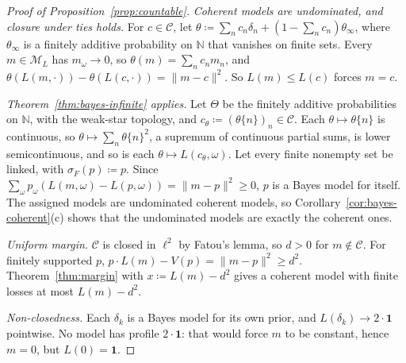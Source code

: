 \documentclass[11pt]{article}
\theoremstyle{definition}
\theoremstyle{remark}
\newcommand{\N}{\mathbb N}
\newcommand{\M}{\mathcal M}
\newcommand{\C}{\mathcal C}
\newcommand{\one}{\mathbf 1}
\begin{document}
\begin{proof}[Proof of Proposition~\ref{prop:countable}]
\emph{Coherent models are undominated, and closure under ties holds.} For $c\in\C$, let $\theta\coloneqq\sum_nc_n\delta_n+(1-\sum_nc_n)\theta_\infty$, where $\theta_\infty$ is a finitely additive probability on $\N$ that vanishes on finite sets. Every $m\in\M_L$ has $m_\omega\to0$, so $\theta(m)=\sum_nc_nm_n$, and $\theta(L(m,\cdot))-\theta(L(c,\cdot))=\lVert m-c\rVert^2$. So $L(m)\le L(c)$ forces $m=c$.

\emph{Theorem~\ref{thm:bayes-infinite} applies.} Let $\Theta$ be the finitely additive probabilities on $\N$, with the weak-star topology, and $c_\theta\coloneqq(\theta\{n\})_n\in\C$. Each $\theta\mapsto\theta\{n\}$ is continuous, so $\theta\mapsto\sum_n\theta\{n\}^2$, a supremum of continuous partial sums, is lower semicontinuous, and so is each $\theta\mapsto L(c_\theta,\omega)$. Let every finite nonempty set be linked, with $\sigma_F(p)\coloneqq p$. Since $\sum_\omega p_\omega(L(m,\omega)-L(p,\omega))=\lVert m-p\rVert^2\ge0$, $p$ is a Bayes model for itself. The assigned models are undominated coherent models, so Corollary~\ref{cor:bayes-coherent}(c) shows that the undominated models are exactly the coherent ones.

\emph{Uniform margin.} $\C$ is closed in $\ell^2$ by Fatou's lemma, so $d>0$ for $m\notin\C$. For finitely supported $p$, $p\cdot L(m)-V(p)=\lVert m-p\rVert^2\ge d^2$. Theorem~\ref{thm:margin} with $x\coloneqq L(m)-d^2$ gives a coherent model with finite losses at most $L(m)-d^2$.

\emph{Non-closedness.} Each $\delta_k$ is a Bayes model for its own prior, and $L(\delta_k)\to2\cdot\one$ pointwise. No model has profile $2\cdot\one$: that would force $m$ to be constant, hence $m=0$, but $L(0)=\one$.
\end{proof}
\end{document}
